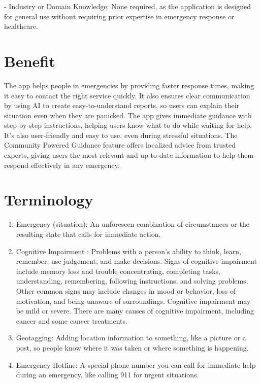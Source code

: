 - Industry or Domain Knowledge: None required, as the application is designed for general use without requiring prior expertise in emergency response or healthcare.


\section{Benefit}
\label{section:benefit}
The app helps people in emergencies by providing faster response times, making it easy to contact the right service quickly. It also ensures clear communication by using AI to create easy-to-understand reports, so users can explain their situation even when they are panicked. The app gives immediate guidance with step-by-step instructions, helping users know what to do while waiting for help. It’s also user-friendly and easy to use, even during stressful situations. The Community Powered Guidance feature offers localized advice from trusted experts, giving users the most relevant and up-to-date information to help them respond effectively in any emergency.


\section{Terminology}
\label{section:terminology}

\begin{enumerate}
    \item Emergency (situation): An unforeseen combination of circumstances or the resulting state that calls for immediate action.
    \item Cognitive Impairment : Problems with a person’s ability to think, learn, remember, use judgement, and make decisions. Signs of cognitive impairment include memory loss and trouble concentrating, completing tasks, understanding, remembering, following instructions, and solving problems. Other common signs may include changes in mood or behavior, loss of motivation, and being unaware of surroundings. Cognitive impairment may be mild or severe. There are many causes of cognitive impairment, including cancer and some cancer treatments.
    \item Geotagging: Adding location information to something, like a picture or a post, so people know where it was taken or where something is happening.
    \item Emergency Hotline: A special phone number you can call for immediate help during an emergency, like calling 911 for urgent situations.
\end{enumerate}
